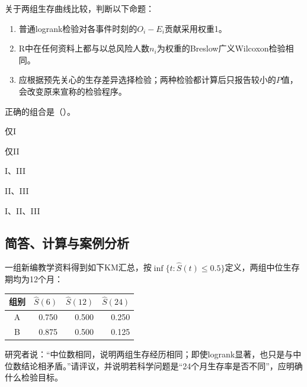 \par\noindent\begin{minipage}{\linewidth}
关于两组生存曲线比较，判断以下命题：
\begin{enumerate}
\item[I.] 普通logrank检验对各事件时刻的$O_i-E_i$贡献采用权重1。
\item[II.] R中在任何资料上都与以总风险人数$n_i$为权重的Breslow广义Wilcoxon检验相同。
\item[III.] 应根据预先关心的生存差异选择检验；两种检验都计算后只报告较小的$P$值，会改变原来宣称的检验程序。
\end{enumerate}
正确的组合是（\quad）。
\begin{choices}
\item 仅I
\item 仅II
\item I、III
\item II、III
\item I、II、III
\end{choices}
\end{minipage}\par\medskip

\subsection{简答、计算与案例分析}

一组新编教学资料得到如下KM汇总，按$\inf\{t:\widehat S(t)\le0.5\}$定义，两组中位生存期均为12个月：
\begin{center}\begin{tabular}{crrr}\toprule
组别 & $\widehat S(6)$ & $\widehat S(12)$ & $\widehat S(24)$\\\midrule
A & 0.750 & 0.500 & 0.250\\
B & 0.875 & 0.500 & 0.125\\\bottomrule
\end{tabular}\end{center}
研究者说：“中位数相同，说明两组生存经历相同；即使logrank显著，也只是与中位数结论相矛盾。”请评议，并说明若科学问题是“24个月生存率是否不同”，应明确什么检验目标。

